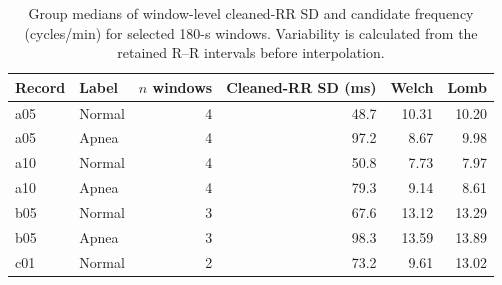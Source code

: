 \begin{table}[htbp]
\centering
\small
\begin{tabular}{llrrrr}
\toprule
Record & Label & $n$ windows & Cleaned-RR SD (ms) & Welch & Lomb \\
\midrule
a05 & Normal & 4 & 48.7 & 10.31 & 10.20 \\
a05 & Apnea & 4 & 97.2 & 8.67 & 9.98 \\
a10 & Normal & 4 & 50.8 & 7.73 & 7.97 \\
a10 & Apnea & 4 & 79.3 & 9.14 & 8.61 \\
b05 & Normal & 3 & 67.6 & 13.12 & 13.29 \\
b05 & Apnea & 3 & 98.3 & 13.59 & 13.89 \\
c01 & Normal & 2 & 73.2 & 9.61 & 13.02 \\
\bottomrule
\end{tabular}
\caption{Group medians of window-level cleaned-RR SD and candidate frequency (cycles/min) for selected 180-s windows. Variability is calculated from the retained R--R intervals before interpolation.}

\label{tab:windows}
\end{table}
